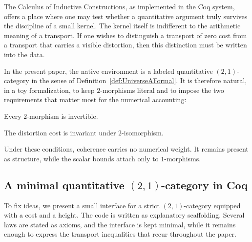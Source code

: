 \documentclass[10pt, reqno]{amsart}
\theoremstyle{plain}
\theoremstyle{definition}
\theoremstyle{plain}
\begin{document}
The Calculus of Inductive Constructions, as implemented in the Coq system, offers a place where one may test whether a quantitative argument truly survives the discipline of a small kernel. The kernel itself is indifferent to the arithmetic meaning of a transport. If one wishes to distinguish a transport of zero cost from a transport that carries a visible distortion, then this distinction must be written into the data.

In the present paper, the native environment is a labeled quantitative $(2,1)$-category in the sense of Definition~\ref{def:UniverseAFormal}. It is therefore natural, in a toy formalization, to keep $2$-morphisms literal and to impose the two requirements that matter most for the numerical accounting:
\begin{subtlelist}
\item Every $2$-morphism is invertible.
\item The distortion cost is invariant under $2$-isomorphism.
\end{subtlelist}
Under these conditions, coherence carries no numerical weight. It remains present as structure, while the scalar bounds attach only to $1$-morphisms.

\subsection{A minimal quantitative $(2,1)$-category in Coq}\label{subsec:CoqQuantCat}

To fix ideas, we present a small interface for a strict $(2,1)$-category equipped with a cost and a height. The code is written as explanatory scaffolding. Several laws are stated as axioms, and the interface is kept minimal, while it remains enough to express the transport inequalities that recur throughout the paper.
\end{document}

